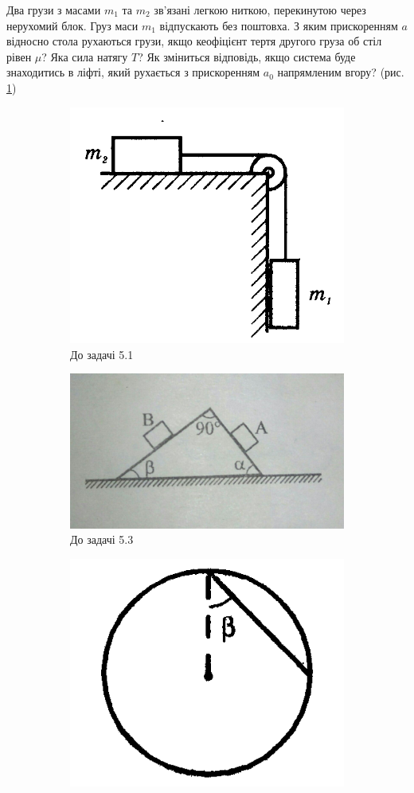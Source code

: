\justifying
\begin{problem}{\label{task_51}}
	Два грузи з масами $m_1$ та $m_2$ зв'язані легкою ниткою, перекинутою через нерухомий блок. Груз маси $m_1$ відпускають без поштовха. З яким прискоренням $a$ відносно стола рухаються грузи, якщо кеофіцієнт тертя другого груза об стіл рівен $\mu$? Яка сила натягу $T$? Як зміниться відповідь, якщо система буде знаходитись в ліфті, який рухається з прискоренням $a_0$ напрямленим вгору? (рис. \ref{fig:day51})
	\begin{figure}[h!]
		\centering
		\begin{subfigure}{.4\textwidth}
			\centering
			\includegraphics[width= 0.5\linewidth]{class5/day5_1}
			\caption{До задачі 5.1}
			\label{fig:day51}
		\end{subfigure}
		\begin{subfigure}{.4\textwidth}
			\centering
			\includegraphics[width=0.5\linewidth]{class5/day5_02}
			\caption{До задачі 5.3}
			\label{fig:day502}
		\end{subfigure}
		\begin{subfigure}{.4\textwidth}
			\centering
			\includegraphics[width=0.5\linewidth]{class5/day5_3}

\end{subfigure}
\end{figure}
\end{problem}
